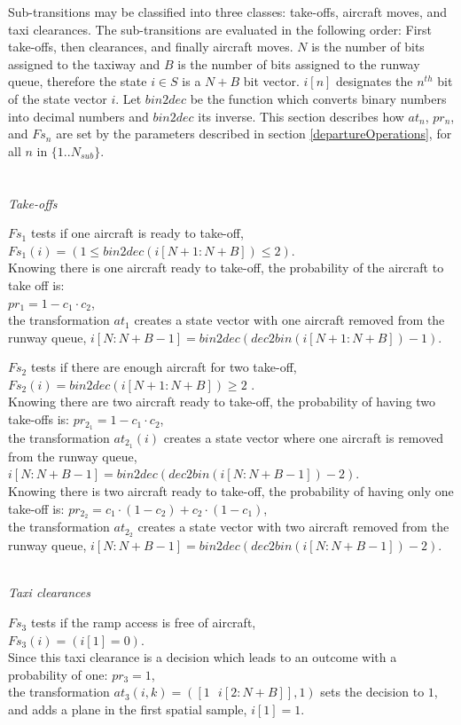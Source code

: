 \documentclass[letterpaper]{article}
\begin{document}
Sub-transitions may be classified into three classes: take-offs, aircraft moves, and taxi clearances.
The sub-transitions are evaluated in the following order: First take-offs, then clearances, and finally aircraft moves.
 $N$ is the number of bits assigned to the taxiway and $B$ is the number of bits assigned to the runway queue, 
 therefore the state $i \in S$ is a $N+B$ bit vector. $i[n]$ designates the $n^{th}$ bit of the state vector $i$. 
 Let $bin2dec$ be the function which converts binary numbers into decimal numbers and $bin2dec$ its inverse. 
 This section describes how $at_n$, $pr_n$, and $Fs_n$ are set by the parameters described
in section \ref{departureOperations}, for all $n$ in $\{1..N_{sub}\}$.
\\
\\
\emph{\\Take-offs}
\begin{description}
\item $Fs_1$ tests if one aircraft is ready to take-off,\\
$Fs_1(i) = (1 \leq bin2dec(i[N+1:N+B]) \leq 2)$. \\
Knowing there is one aircraft ready to take-off, the probability of the aircraft to take off is: \\ $pr_1 = 1 - c_1 \cdot c_2$,\\
 the transformation $at_1$ creates a state vector with one aircraft removed from the runway queue, $i[N:N+B-1] = bin2dec(dec2bin(i[N+1:N+B])-1)$.

\item $Fs_2$ tests if there are enough aircraft for two take-off,\\
 $Fs_2(i) = bin2dec(i[N+1:N+B]) \geq 2$ .\\
 Knowing there are two aircraft ready to take-off, the probability of having two take-offs is: $pr_{2_1} = 1 - c_1 \cdot c_2$, \\
 the transformation $at_{2_1}(i)$ creates a state vector where one aircraft is removed from the runway queue, $i[N:N+B-1] = bin2dec(dec2bin(i[N:N+B-1])-2)$. \\
 Knowing there is two aircraft ready to take-off, the probability of having only one take-off is: $pr_{2_2} = c_1 \cdot (1-c_2) + c_2 \cdot (1-c_1)$,\\
 the transformation $at_{2_2}$ creates a state vector with two aircraft removed from the runway queue, $i[N:N+B-1] = bin2dec(dec2bin(i[N:N+B-1])-2)$.
\end{description}

\emph{\\Taxi clearances}
\begin{description}
\item $Fs_3$ tests if the ramp access is free of aircraft,\\
$Fs_3(i) = (i[1] = 0)$.\\
Since this taxi clearance is a decision which leads to an outcome with a probability of one: $pr_3 = 1$,\\
the transformation $at_{3}(i,k) = ([1 \text{ } i[2:N+B]],1)$ sets the decision to $1$, and adds a plane in the first spatial sample, $i[1] = 1$.
\end{description}
\end{document}
